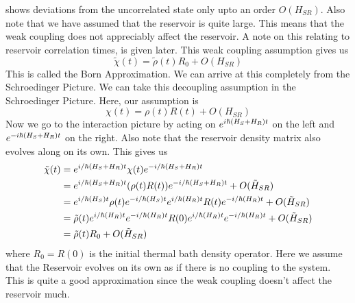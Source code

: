 \documentclass{scrartcl}
\newcommand{\1}{\mathbbm{1}}
\newcommand{\ihsr}{\tilde{H}_{SR}}
\begin{document}
shows deviations from the uncorrelated state only upto an order $O(H_{SR})$. Also note that we have assumed that the 
reservoir is quite large. This means that the weak coupling does not appreciably affect the reservoir. 
A note on this relating to reservoir correlation times, is given later.
This weak coupling assumption gives us 
\begin{equation*}
    \tilde{\chi}(t) = \tilde{\rho}(t) R_0  + O(H_{SR})  \label{eq:born_assumption}
\end{equation*}
This is called the Born Approximation. We can arrive at this completely from the Schroedinger Picture. We can take 
this decoupling assumption in the Schroedinger Picture. Here, our assumption is
\[ \chi (t)  = \rho(t) R(t) + O(H_{SR})\]
Now we go to the interaction picture by acting on \(e^{i\/\hbar (H_S+H_R)t}\) on the left and \(e^{-i\/\hbar (H_S+H_R)t}\) on the right. 
Also note that the reservoir density matrix also evolves along on its own. This gives us
\begin{align}
    \tilde{\chi}(t) &= e^{i\slash \hbar (H_S + H_R)t} \chi (t) e^{-i\slash \hbar (H_S + H_R)t} \\ \nonumber
    &= e^{i\slash \hbar (H_S + H_R)t} \qty(\rho(t) R(t)) e^{-i\slash \hbar (H_S + H_R)t} + O(\ihsr)\\ \nonumber
    &= e^{i\slash \hbar (H_S )t} \rho(t) e^{-i\slash \hbar (H_S)t} e^{i\slash \hbar (H_R )t} R(t) e^{-i\slash \hbar (H_R)t} + O(\ihsr)\\ \nonumber
    &= \tilde{\rho}(t) e^{i\slash \hbar (H_R )t} e^{-i\slash \hbar (H_R)t} R(0) e^{i\slash \hbar (H_R )t} e^{-i\slash \hbar (H_R)t} + O(\ihsr)\\ \nonumber
    &= \tilde{\rho}(t) R_0 + O(\ihsr)
\end{align}
where $R_0 = R(0)$ is the initial thermal bath density operator. Here we assume that the Reservoir evolves on its own as if there 
is no coupling to the system. This is quite a good approximation since the weak coupling doesn't affect the reservoir much.
\end{document}
